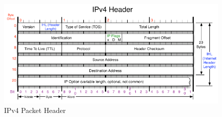 \documentclass[final_report.tex]{subfiles}
\begin{document}
\begin{figure}[H]
	\centering
	\includegraphics[width=\textwidth]{img/ipv4header.png}
	\caption{IPv4 Packet Header \cite{ipv4}}
	\label{fig:ipv4}
\end{figure}
\end{document}

